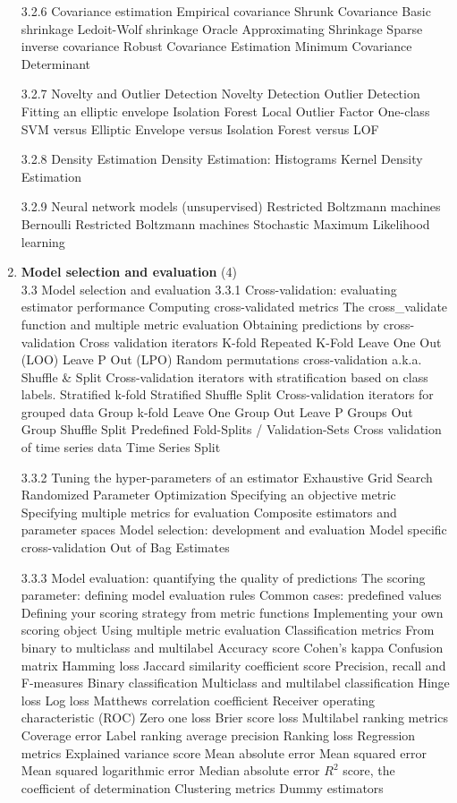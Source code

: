 \documentclass{article}
\begin{document}
\begin{enumerate}
3.2.6 Covariance estimation
Empirical covariance
Shrunk Covariance
Basic shrinkage
Ledoit-Wolf shrinkage
Oracle Approximating Shrinkage
Sparse inverse covariance
Robust Covariance Estimation
Minimum Covariance Determinant

3.2.7 Novelty and Outlier Detection
Novelty Detection
Outlier Detection
Fitting an elliptic envelope
Isolation Forest
Local Outlier Factor
One-class SVM versus Elliptic Envelope versus Isolation Forest versus LOF

3.2.8 Density Estimation
Density Estimation: Histograms
Kernel Density Estimation

3.2.9 Neural network models (unsupervised)
Restricted Boltzmann machines
Bernoulli Restricted Boltzmann machines
Stochastic Maximum Likelihood learning

\item \textbf{Model selection and evaluation} (4)\\
3.3 Model selection and evaluation
3.3.1 Cross-validation: evaluating estimator performance
Computing cross-validated metrics
The cross_validate function and multiple metric evaluation
Obtaining predictions by cross-validation
Cross validation iterators
K-fold
Repeated K-Fold
Leave One Out (LOO)
Leave P Out (LPO)
Random permutations cross-validation a.k.a. Shuffle \& Split
Cross-validation iterators with stratification based on class labels.
Stratified k-fold
Stratified Shuffle Split
Cross-validation iterators for grouped data
Group k-fold
Leave One Group Out
Leave P Groups Out
Group Shuffle Split
Predefined Fold-Splits / Validation-Sets
Cross validation of time series data
Time Series Split

3.3.2 Tuning the hyper-parameters of an estimator
Exhaustive Grid Search
Randomized Parameter Optimization
Specifying an objective metric
Specifying multiple metrics for evaluation
Composite estimators and parameter spaces
Model selection: development and evaluation
Model specific cross-validation
Out of Bag Estimates

3.3.3 Model evaluation: quantifying the quality of predictions
The scoring parameter: defining model evaluation rules
Common cases: predefined values
Defining your scoring strategy from metric functions
Implementing your own scoring object
Using multiple metric evaluation
Classification metrics
From binary to multiclass and multilabel
Accuracy score
Cohen’s kappa
Confusion matrix
Hamming loss
Jaccard similarity coefficient score
Precision, recall and F-measures
Binary classification
Multiclass and multilabel classification
Hinge loss
Log loss
Matthews correlation coefficient
Receiver operating characteristic (ROC)
Zero one loss
Brier score loss
Multilabel ranking metrics
Coverage error
Label ranking average precision
Ranking loss
Regression metrics
Explained variance score
Mean absolute error
Mean squared error
Mean squared logarithmic error
Median absolute error
$R^2$ score, the coefficient of determination
Clustering metrics
Dummy estimators


\end{enumerate}
\end{document}
